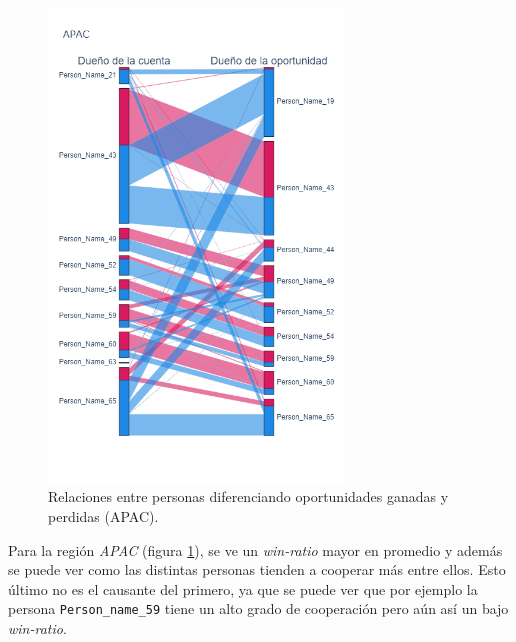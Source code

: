 \documentclass[titlepage,a4paper]{article}
\begin{document}
\begin{figure}[H]
\centering
\includegraphics[width=0.7\textwidth]{images/ps_personas_APAC.png}
\cprotect\caption{\label{fig:ps_personas_APAC} Relaciones entre personas diferenciando oportunidades ganadas y perdidas (APAC).}
\end{figure}

Para la región \textit{APAC} (figura \ref{fig:ps_personas_APAC}), se ve un \textit{win-ratio} mayor en promedio y además se puede ver como las distintas personas tienden a cooperar más entre ellos. Esto último no es el causante del primero, ya que se puede ver que por ejemplo la persona \verb|Person_name_59| tiene un alto grado de cooperación pero aún así un bajo \textit{win-ratio}.
\end{document}
